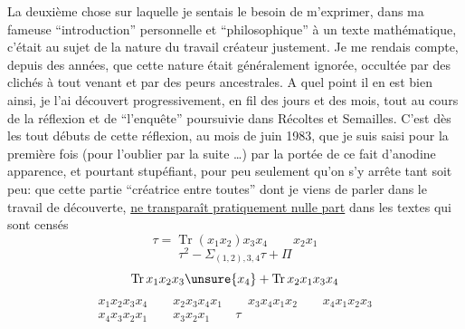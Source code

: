La deuxième chose sur laquelle je sentais le besoin de m'exprimer, dans ma fameuse ``introduction''
 personnelle et ``philosophique'' à un texte mathématique,
c'était au sujet de la nature du travail créateur justement.
Je me rendais compte, depuis des années, que cette nature était généralement ignorée,
occultée par des clichés à tout venant et par des peurs ancestrales.
A quel point il en est bien ainsi, je l'ai découvert progressivement, en fil des jours et des mois,
tout au cours de la réflexion et de ``l'enquête'' poursuivie dans Récoltes et Semailles.
C'est dès les tout débuts de cette réflexion, au mois de juin 1983, que je suis saisi pour la première fois
(pour l'oublier par la suite \ldots) par la portée de ce fait d'anodine apparence,
et pourtant  stupéfiant, pour peu seulement qu'on s'y arrête tant soit peu:
que cette partie ``créatrice entre toutes'' dont je viens de parler dans le travail de découverte,
\uline{ne transparaît pratiquement nulle part} dans les textes qui sont censés
\[\tau=\operatorname{Tr}(x_1x_2)x_3x_4\qquad x_2x_1\]
\[\tau^2-\Sigma_{(1,2),3,4}\tau+\Pi\]
\[\operatorname{Tr}x_1x_2x_3\unsure{x_4}
 +\operatorname{Tr}x_2x_1x_3x_4\]
\[
\begin{gathered}
x_1x_2x_3x_4\qquad x_2x_3x_4x_1\qquad x_3x_4x_1x_2\qquad x_4x_1x_2x_3\\
x_4x_3x_2x_1\qquad x_3x_2x_1\qquad\tau
\end{gathered}
\]
